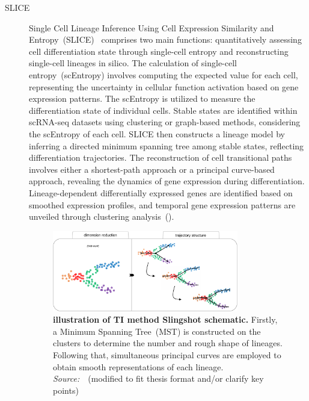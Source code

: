 \begin{description}
  \item[SLICE]
  Single Cell Lineage Inference Using Cell Expression Similarity and Entropy~(SLICE)~\citep{guo2017slice} comprises two main functions: quantitatively assessing cell differentiation state through single-cell entropy and reconstructing single-cell lineages in silico. The calculation of single-cell entropy~(scEntropy) involves computing the expected value for each cell, representing the uncertainty in cellular function activation based on gene expression patterns. The scEntropy is utilized to measure the differentiation state of individual cells. Stable states are identified within scRNA-seq datasets using clustering or graph-based methods, considering the scEntropy of each cell. SLICE then constructs a lineage model by inferring a directed minimum spanning tree among stable states, reflecting differentiation trajectories. The reconstruction of cell transitional paths involves either a shortest-path approach or a principal curve-based approach, revealing the dynamics of gene expression during differentiation. Lineage-dependent differentially expressed genes are identified based on smoothed expression profiles, and temporal gene expression patterns are unveiled through clustering analysis~().

\begin{figure}[h!]
  	\centering
  	\includegraphics[width=0.8\textwidth]{TI_Alg_slingshot/fig}
  	\vspace{0.1cm}
  	\caption[Illustration of TI method Slingshot schematic.]{\textbf{illustration of TI method Slingshot schematic.}
  	Firstly, a Minimum Spanning Tree~(MST) is constructed on the clusters to determine the number and rough shape of lineages. Following that, simultaneous principal curves are employed to obtain smooth representations of each lineage. \emph{Source:~\cite{street2018slingshot}}~(modified to fit thesis format and/or clarify key points)
  	}
  	\label{fig:TI_Alg_slingshot}
\end{figure}


\end{description}

